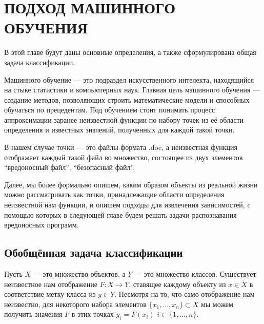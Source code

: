 \chapter{ПОДХОД МАШИННОГО ОБУЧЕНИЯ}

В этой главе будут даны основные определения, а также  сформулирована общая задача классификации.

Машинного обучение — это подраздел искусственного интелекта, находящийся на стыке статистики и компьютерных наук. Главная цель машинного обучения — создание методов, позволяющих строить математические модели и способных обучаться по прецедентам. Под обучением стоит понимать процесс аппроксимации заранее неизвестной функции по набору точек из её области определения и известных значений, полученных для каждой такой точки.

В нашем случае точки — это файлы формата .doc, а неизвестная функция отображает каждый такой файл во множество, состоящее из двух элементов {“вредоносный файл”, “безопасный файл”}.

Далее, мы более формально опишем, каким образом объекты  из реальной жизни можно рассматривать как точки, принадлежащие области определения неизвестной нам функции, и опишем подходы для извлечения зависимостей, c помощью которых в следующей главе будем решать задачи распознавания вредоносных программ.

\section{Обобщённая задача классификации}

Пусть $X$ — это множество объектов, а $Y$ — это множество классов.
Существует неизвестное нам отображение $F : X \to Y$, ставящее каждому объекту из $x \in X$ в соответствие метку класса из $y \in Y$.
Несмотря на то, что само отображение нам неизвестно, для некоторого набора элементов $\{ x_1, \dots , x_n \} \subset X$ мы можем получить значения $F$ в этих точках  $y_i = F(x_i)$ $i \subset \{ 1, \dots, n \}$.
